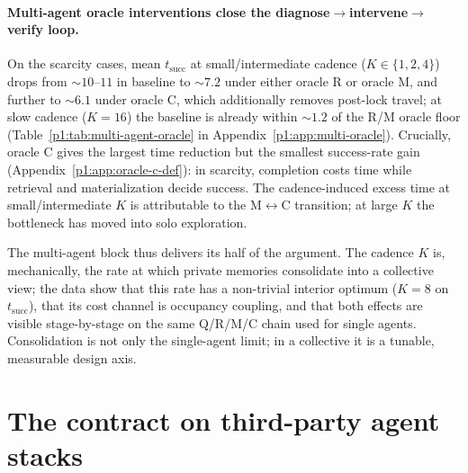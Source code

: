 \documentclass{article}
\begin{document}
\paragraph{Multi-agent oracle interventions close the diagnose$\to$intervene$\to$verify loop.}
On the scarcity cases, mean $t_{\mathrm{succ}}$ at small/intermediate cadence ($K{\in}\{1,2,4\}$) drops from $\sim10$--$11$ in baseline to $\sim7.2$ under either oracle R or oracle M, and further to $\sim6.1$ under oracle C, which additionally removes post-lock travel; at slow cadence ($K{=}16$) the baseline is already within $\sim1.2$ of the R/M oracle floor (Table~\ref{p1:tab:multi-agent-oracle} in Appendix~\ref{p1:app:multi-oracle}). Crucially, oracle C gives the largest time reduction but the smallest success-rate gain (Appendix~\ref{p1:app:oracle-c-def}): in scarcity, completion costs time while retrieval and materialization decide success. The cadence-induced excess time at small/intermediate $K$ is attributable to the M$\leftrightarrow$C transition; at large $K$ the bottleneck has moved into solo exploration.

The multi-agent block thus delivers its half of the argument. The
cadence $K$ is, mechanically, the rate at which private memories
consolidate into a collective view; the data show that this rate has a
non-trivial interior optimum ($K\!=\!8$ on $t_{\mathrm{succ}}$), that
its cost channel is occupancy coupling, and that both effects are
visible stage-by-stage on the same Q/R/M/C chain used for single
agents. Consolidation is not only the single-agent limit; in a
collective it is a tunable, measurable design axis.

\section{The contract on third-party agent stacks}
\label{p1:sec:external}
\end{document}
